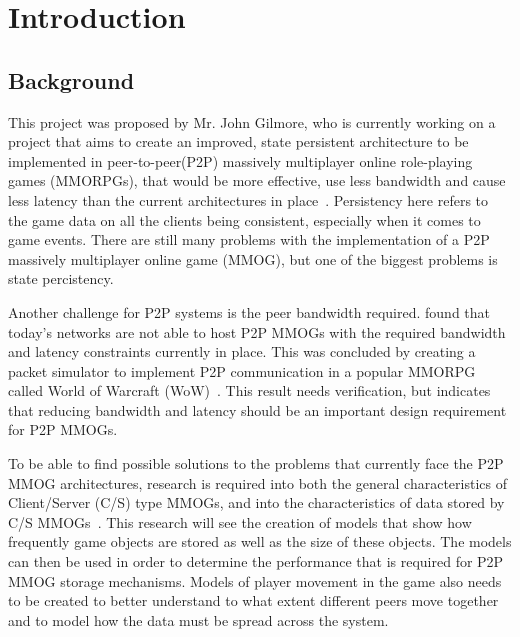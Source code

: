 \chapter{Introduction}		%
\label{ch1}
\section{Background}

This project was proposed by Mr. John Gilmore,  who %
is currently working on a project that aims to create an improved, state persistent architecture to be implemented in peer-to-peer(P2P) massively multiplayer online role-playing games (MMORPGs), that would be more effective, use less bandwidth and cause less latency than the current architectures in place~\cite{gilmore}. Persistency here refers to the game data on all the clients being consistent, especially when it comes to  game events. There are still many problems with the implementation of a P2P massively multiplayer online game (MMOG), but one of the biggest problems is state percistency. %

Another challenge for P2P systems is the peer bandwidth required. \citet{p2p} found that today's networks are not able to host P2P MMOGs with the required bandwidth and latency constraints currently in place. This was concluded by creating a packet simulator to implement P2P communication in a popular MMORPG called World of Warcraft (WoW)~\cite{p2p}. This result needs verification, but indicates that reducing bandwidth and latency should be an important design requirement for P2P MMOGs.

To be able to find possible solutions to the problems that currently face the P2P MMOG architectures, research is required into both the general characteristics of Client/Server (C/S) type MMOGs, and into the characteristics of data stored by C/S MMOGs~\cite{gilmore}. This research will see the creation of models that show how frequently game objects are stored as well as the size of these objects. The models can then be used in order to determine the performance that is required for P2P MMOG storage mechanisms. Models of player movement in the game also needs to be created to better understand to what extent different peers move together and to model how the data must be spread across the system. 

